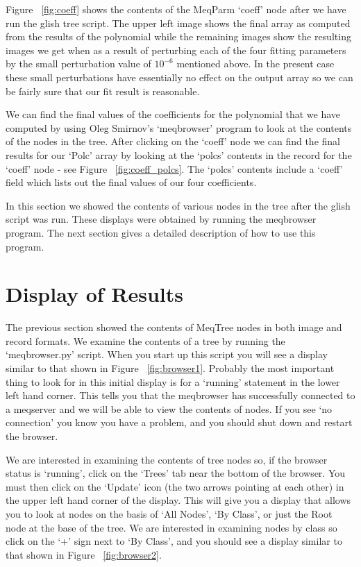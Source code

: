 \documentclass[10pt]{article}
\begin{document}
Figure ~\ref{fig:coeff} shows the contents of the MeqParm `coeff'
node after we have run the glish tree script. The upper left image
shows the final array as computed from the results of the polynomial
while the remaining images show the resulting images we get when
as a result of perturbing each of the four fitting parameters by 
the small perturbation value of $10^{-6}$ mentioned above.
In the present case these small perturbations have essentially
no effect on the output array so we can be fairly sure that our
fit result is reasonable.
 
We can find the final values of the coefficients for the polynomial
that we have computed by using Oleg Smirnov's `meqbrowser' program to look at
the contents of the nodes in the tree. After clicking on the `coeff' node
we can find the final results for our `Polc' array by looking at the 
`polcs' contents in the record for the `coeff' node - see 
Figure  ~\ref{fig:coeff_polcs}. The `polcs' contents include a `coeff' field
which lists out the final values of our four coefficients. 

In this section we showed the contents of various nodes in the 
tree after the glish script was run. These displays were obtained
by running the meqbrowser program. The next section gives a detailed
description of how to use this program.

\section{Display of Results}

The previous section showed the contents of MeqTree nodes in both 
image and record formats. We examine the contents of a tree
by running the `meqbrowser.py' script. When you start up this script
you will see a display similar to that shown in 
Figure  ~\ref{fig:browser1}. Probably the most important thing to
look for in this initial display is for a `running' statement in the
lower left hand corner. This tells you that the meqbrowser has
successfully connected to a meqserver and we will be able to view
the contents of nodes. If you see `no connection' you know you have a
problem, and you should shut down and restart the browser.

We are interested in examining the contents of tree nodes so, if the
browser status is `running', click on the `Trees' tab near the
bottom of the browser. You must then click on the `Update' icon
(the two arrows pointing at each other) in the upper left hand
corner of the display. This will give you a display that allows you
to look at nodes on the basis of `All Nodes', `By Class', or just 
the Root node at the base of the tree. 
We are interested in examining nodes by class so click
on the `+' sign next to `By Class', and you should see a display
similar to that shown in Figure  ~\ref{fig:browser2}. 
\end{document}
